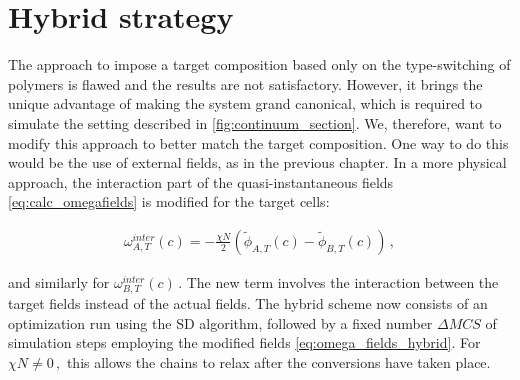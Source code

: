 \documentclass[bachelor,       %
               oneside,        %
               BCOR10mm,       %
               ngerman, english %
               ]{GAUBM}
\begin{document}
\section{Hybrid strategy}
\label{sec:hybrid}

The approach to impose a target composition based only on the type-switching of polymers is flawed and the results are not satisfactory. However, it brings the unique advantage of making the system grand canonical, which is required to simulate the setting described in \autoref{fig:continuum_section}. We, therefore, want to modify this approach to better match the target composition. One way to do this would be the use of external fields, as in the previous chapter. In a more physical approach, the interaction part of the quasi-instantaneous fields \autoref{eq:calc_omegafields} is modified for the target cells:

\begin{align}
    \omega^{inter}_{A,T}(c)=-\frac{\chi N}{2}\left(\tilde\phi_{A,T}(c)-\tilde\phi_{B,T}(c)\right)\,,
    \label{eq:omega_fields_hybrid}
\end{align}

and similarly for $\omega^{inter}_{B,T}(c)\,.$ The new term involves the interaction between the target fields instead of the actual fields. The hybrid scheme now consists of an optimization run using the \ac{SD} algorithm, followed by a fixed number $\Delta MCS$ of simulation steps employing the modified fields \autoref{eq:omega_fields_hybrid}. For $\chi N\neq 0\,,$ this allows the chains to relax after the conversions have taken place.




\end{document}

